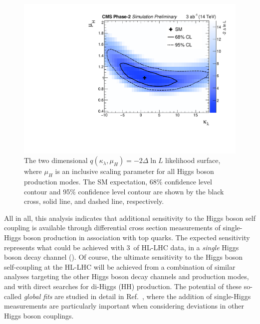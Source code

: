 \begin{figure}[htb!]
  \centering
  \includegraphics[width=.6\textwidth]{Figures/cms/trilinear/CMS-PAS-FTR-18-020_Figure_008.pdf}
  \caption[Two dimensional likelihood scan in $\kappa_\lambda$-vs-$\mu_H$]
  {
    The two dimensional $q(\kappa_\lambda,\mu_H)=-2\Delta \ln L$ likelihood surface, where $\mu_H$ is an inclusive scaling parameter for all Higgs boson production modes. The SM expectation, 68\%  confidence level contour and 95\% confidence level contour are shown by the black cross, solid line, and dashed line, respectively.
  }
  \label{fig:trilinear_2d}
\end{figure}

All in all, this analysis indicates that additional sensitivity to the Higgs boson self coupling is available through differential cross section measurements of single-Higgs boson production in association with top quarks. The expected sensitivity represents what could be achieved with 3~\abinv of HL-LHC data, in a \textit{single} Higgs boson decay channel (\Hgg). Of course, the ultimate sensitivity to the Higgs boson self-coupling at the HL-LHC will be achieved from a combination of similar analyses targeting the other Higgs boson decay channels and production modes, and with direct searches for di-Higgs (HH) production. The potential of these so-called \textit{global fits} are studied in detail in Ref.~\cite{DiVita:2017eyz}, where the addition of single-Higgs measurements are particularly important when considering deviations in other Higgs boson couplings.

